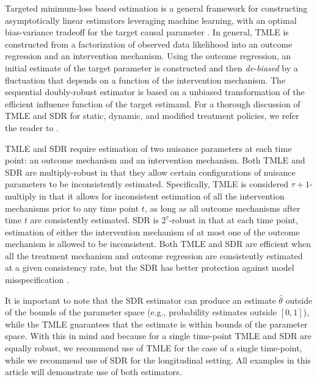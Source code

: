\documentclass[]{jss}
\begin{document}
Targeted minimum-loss based estimation is a general framework for
constructing asymptotically linear estimators leveraging machine
learning, with an optimal bias-variance tradeoff for the target causal
parameter \citep{vanderLaanRose11, vanderLaanRose18}. In general, TMLE
is constructed from a factorization of observed data likelihood into
an outcome regression and an intervention mechanism. Using the outcome
regression, an initial estimate of the target parameter is constructed
and then \textit{de-biased} by a fluctuation that depends on a
function of the intervention mechanism. The sequential doubly-robust
estimator is based on a unbiased transformation of the efficient
influence function of the target estimand. For a thorough discussion
of TMLE and SDR for static, dynamic, and modified treatment policies,
we refer the reader to
\cite{van2011targeted,luedtke2017sequential,rotnitzky2017multiply,
  diazNonparametricCausalEffects2020a}.

TMLE and SDR require estimation of two nuisance parameters at each
time point: an outcome mechanism and an intervention mechanism. Both
TMLE and SDR are multiply-robust in that they allow certain
configurations of nuisance parameters to be inconsistently
estimated. Specifically, TMLE is considered \(\tau + 1\)-multiply in
that it allows for inconsistent estimation of all the intervention
mechanisms prior to any time point $t$, as long as all outcome
mechanisms after time $t$ are consistently estimated. SDR is
\(2^{\tau}\)-robust in that at each time point, estimation of either
the intervention mechanism of at most one of the outcome mechanism is
allowed to be inconsistent. Both TMLE and SDR are efficient when all
the treatment mechanism and outcome regression are consistently
estimated at a given consistency rate, but the SDR has better
protection against model misspecification \citep[see][for more details]{luedtke2017sequential,rotnitzky2017multiply,
  diazNonparametricCausalEffects2020a}.

It is important to note that the SDR estimator can produce an estimate
\(\hat{\theta}\) outside of the bounds of the parameter space
(e.g., probability estimates outside $[0,1]$), while the TMLE
guarantees that the estimate is within bounds of the parameter
space. With this in mind and because for a single time-point TMLE and
SDR are equally robust, we recommend use of TMLE for the case of a
single time-point, while we recommend use of SDR for the longitudinal
setting. All examples in this article will demonstrate use of both
estimators.
\end{document}
